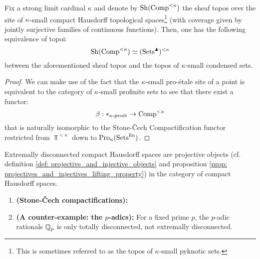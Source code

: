                \begin{lemma} \label{lemma: sheaves_over_compact_hausdorff_spaces}
                    Fix a strong limit cardinal $\kappa$ and denote by $\mathrm{Sh}(\mathrm{Comp}^{< \kappa})$ the sheaf topos over the site of $\kappa$-small compact Hausdorff topological spaces\footnote{This is sometimes referred to as the topos of $\kappa$-small pyknotic sets.} (with coverage given by jointly surjective families of continuous functions). Then, one has the following equivalence of topoi:
                        $$\mathrm{Sh}(\mathrm{Comp}^{< \kappa}) \simeq (\mathrm{Sets}^{\blacktriangle})^{< \kappa}$$
                    between the aforementioned sheaf topos and the topos of $\kappa$-small condensed sets.
                \end{lemma}
                    \begin{proof}
                        We can make use of the fact that the $\kappa$-small pro-\'etale site of a point is equivalent to the category of $\kappa$-small profinite sets to see that there exist a functor:
                            $$\beta: *_{\kappa\text{-}\mathrm{pro\acute{e}t}} \to \mathrm{Comp}^{< \kappa}$$
                        that is naturally isomorphic to the Stone-\v{C}ech Compactification functor restricted from $\Top^{< \kappa}$ down to $\mathrm{Pro}_{\kappa}(\mathrm{Sets}^{\mathrm{fin}})$. 
                    \end{proof}
                
                \begin{definition} \label{def: extrememly_disconnected_sets}
                    Extremally disconnected compact Hausdorff spaces are projective objects (cf. definition \ref{def: projective_and_injective_objects} and proposition \ref{prop: projectives_and_injectives_lifting_property}) in the category of compact Hausdorff spaces.
                \end{definition}
                \begin{example}
                    \noindent
                    \begin{enumerate}
                        \item \textbf{(Stone-\v{C}ech compactifications):}
                        \item \textbf{(A counter-example: the $p$-adics):} For a fixed prime $p$, the $p$-adic rationals $\mathbb{Q}_p$ is only totally disconnected, not extremally disconnected. 
                    \end{enumerate}
                \end{example}
                
